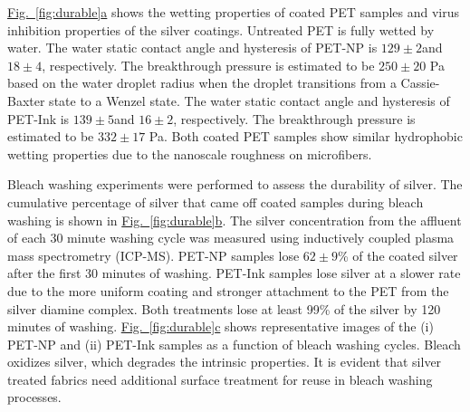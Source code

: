 \documentclass[journal=jacsat,manuscript=article]{achemso}
\newcommand{\figref}[2][]{\hyperref[#2]{Fig.~\ref{#2}#1}}
\begin{document}
\figref[a]{fig:durable} shows the wetting  properties of coated PET samples and virus inhibition properties of the silver coatings. Untreated PET is fully wetted by water. The water static contact angle and hysteresis of PET-NP is $129 \pm 2$\degree and $18 \pm 4$\degree, respectively. 
The breakthrough pressure is estimated to be 
$250 \pm 20$ Pa based on the water droplet radius when the droplet transitions from a Cassie-Baxter state to a Wenzel state.  
The water static contact angle and hysteresis of PET-Ink is $139 \pm 5$\degree and $16 \pm 2$\degree, respectively. The breakthrough pressure is estimated to be $332 \pm 17$ Pa. 
Both coated PET samples show similar hydrophobic wetting properties due to the nanoscale roughness on microfibers. %

Bleach washing experiments were performed to assess the durability of silver.  
The cumulative percentage of silver that came off coated samples during bleach washing is shown in \figref[b]{fig:durable}. The silver concentration from the affluent of each 30 minute washing cycle was measured using inductively coupled plasma mass spectrometry (ICP-MS). PET-NP samples lose $62 \pm 9$\% of the coated silver after the first 30 minutes of washing. PET-Ink samples lose silver at a slower rate due to the more uniform coating and stronger attachment to the PET from the silver diamine complex. Both treatments lose at least 99\% of the silver by 120 minutes of washing. 
\figref[c]{fig:durable} shows representative images of the (i) PET-NP and (ii) PET-Ink samples as a function of bleach washing cycles.  
Bleach oxidizes silver, which degrades the intrinsic properties. It is evident that silver treated fabrics need additional surface treatment for reuse in bleach washing processes. 
\end{document}
